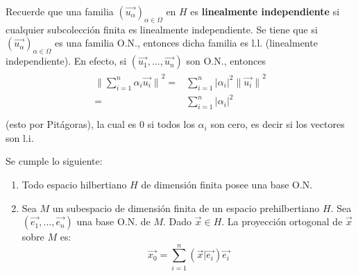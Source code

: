 \documentclass[12pt]{report}
\theoremstyle{largebreak}
\newcommand\abs[1]{\ensuremath{\big|#1\big|}}
\newcommand\norm[1]{\ensuremath{\|#1\|}}
\newcommand\pint[2]{\ensuremath{\left(#1\big| #2\right)}}
\begin{document}
    Recuerde que una familia $\left(\vec{u_\alpha} \right)_{\alpha\in\Omega}$ en $H$ es \textbf{linealmente independiente} si cualquier subcolección finita es linealmente independiente. Se tiene que si $\left(\vec{u_\alpha} \right)_{\alpha\in\Omega}$ es una familia O.N., entonces dicha familia es l.l. (linealmente independiente). En efecto, si $(\vec{u_1},...,\vec{u_n})$ son O.N., entonces
    \begin{eqnarray}
        \begin{split}
            \norm{\sum_{i=1 }^{n}\alpha_i\vec{u_i}}^2=& \sum_{i=1 }^{n}\abs{\alpha_i}^2\norm{\vec{u_i}}^2 \\
            =& \sum_{i=1 }^{n}\abs{\alpha_i}^2 \\
        \end{split}
    \end{eqnarray}
    (esto por Pitágoras), la cual es 0 si todos los $\alpha_i$ son cero, es decir si los vectores son l.i.

    \begin{propo}
        Se cumple lo siguiente:
        \begin{enumerate}
            \item Todo espacio hilbertiano $H$ de dimensión finita posee una base O.N.
            \item Sea $M$ un subespacio de dimensión finita de un espacio prehilbertiano $H$. Sea $(\vec{e_1},...,\vec{e_n})$ una base O.N. de $M$. Dado $\vec{x}\in H$. La proyección ortogonal de $\vec{x}$ sobre $M$ es:
            \begin{equation*}
                \vec{x_0}=\sum_{ i=1}^{n}\pint{\vec{x}}{\vec{e_i}}\vec{e_i}
            \end{equation*}
        \end{enumerate}
    \end{propo}
\end{document}
